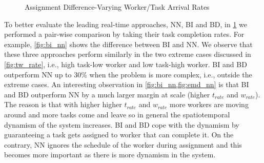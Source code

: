 \begin{figure}[h]
	\centering
	\caption{\small{Assignment Difference-Varying Worker/Task Arrival Rates}}\label{fig:rate_comp}
\end{figure}

To better evaluate the leading real-time approaches, NN, BI and BD, in \cref{fig:rate_comp} we performed a pair-wise comparison by taking their task completion rates. For example, \cref{fig:bi_nn} shows the difference between BI and NN. We observe that these three approaches perform similarly in the two extreme cases discussed in \cref{fig:tw_rate}, i.e., high task-low worker and low task-high worker. BI and BD outperform NN up to 30\% when the problem is more complex, i.e., outside the extreme cases. An interesting observation in \cref{fig:bi_nn,fig:emd_nn} is that BI and BD outperform NN by a much larger margin at scale (higher $t_{rate}$ and $w_{rate}$). The reason is that with higher higher $t_{rate}$ and $w_{rate}$ more workers are moving around and more tasks come and leave so in general the spatiotemporal dynamism of the system increases. BI and BD cope with the dynamism by guaranteeing a task gets assigned to worker that can complete it. On the contrary, NN ignores the schedule of the worker during assignment and this becomes more important as there is more dynamism in the system.


